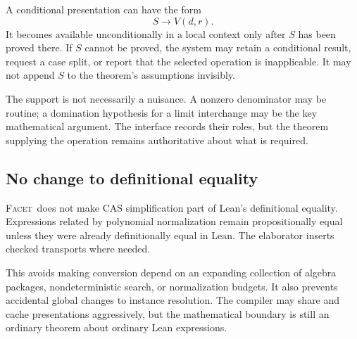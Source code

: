 \documentclass[11pt,a4paper]{article}
\newcommand{\Facet}{\textsc{Facet}}
\theoremstyle{definition}
\begin{document}
A conditional presentation can have the form
\[
 S\longrightarrow V(d,r).
\]
It becomes available unconditionally in a local context only after \(S\) has been
proved there. If \(S\) cannot be proved, the system may retain a conditional result,
request a case split, or report that the selected operation is inapplicable. It
may not append \(S\) to the theorem's assumptions invisibly.

The support is not necessarily a nuisance. A nonzero denominator may be routine;
a domination hypothesis for a limit interchange may be the key mathematical
argument. The interface records their roles, but the theorem supplying the
operation remains authoritative about what is required.

\subsection{No change to definitional equality}
\Facet\ does not make CAS simplification part of Lean's definitional equality.
Expressions related by polynomial normalization remain propositionally equal
unless they were already definitionally equal in Lean. The elaborator inserts
checked transports where needed.

This avoids making conversion depend on an expanding collection of algebra
packages, nondeterministic search, or normalization budgets. It also prevents
accidental global changes to instance resolution. The compiler may share and
cache presentations aggressively, but the mathematical boundary is still an
ordinary theorem about ordinary Lean expressions.

\begin{center}
\end{center}
\end{document}

